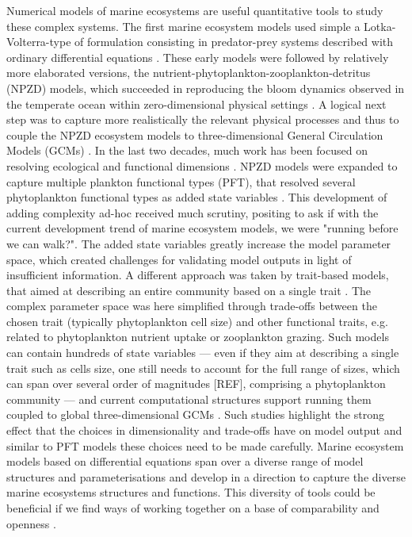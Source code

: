 \documentclass[journal abbreviation, manuscript]{copernicus}
\begin{document}
Numerical models of marine ecosystems are useful quantitative tools to study these complex systems. The first marine ecosystem models used simple a Lotka-Volterra-type of formulation consisting in predator-prey systems described with ordinary differential equations \citep{Fleming1939, Riley1946FactorsBank}. These early models were followed by relatively more elaborated versions, the nutrient-phytoplankton-zooplankton-detritus (NPZD) models, which succeeded in reproducing the bloom dynamics observed in the temperate ocean within zero-dimensional physical settings \citep{Evans1985ACycles, Fasham1990a}. A logical next step was to capture more realistically the relevant physical processes and thus to couple the NPZD ecosystem models to three-dimensional General Circulation Models (GCMs) \citep[e.g.][]{Sarmiento1993AZone}. In the last two decades, much work has been focused on resolving ecological and functional dimensions \citep{Follows2011ModelingMicrobes}. NPZD models were expanded to capture multiple plankton functional types (PFT), that resolved several phytoplankton functional types as added state variables \citep{LeQuere2005}. This development of adding complexity ad-hoc received much scrutiny, positing \citet{Anderson2005} to ask if with the current development trend of marine ecosystem models, we were "running before we can walk?". The added state variables greatly increase the model parameter space, which created challenges for validating model outputs in light of insufficient information. A different approach was taken by trait-based models, that aimed at describing an entire community based on a single trait \citep{Bruggeman2007a, Merico2009, Follows2007EmergentOcean}. The complex parameter space was here simplified through trade-offs between the chosen trait (typically phytoplankton cell size) and other functional traits, e.g. related to phytoplankton nutrient uptake or zooplankton grazing.
Such models can contain hundreds of state variables — even if they aim at describing a single trait such as cells size, one still needs to account for the full range of sizes, which can span over several order of magnitudes [REF], comprising a phytoplankton community — and current computational structures support running them coupled to global three-dimensional GCMs \citep{Dutkiewicz2020DimensionsDiversity}. Such studies highlight the strong effect that the choices in dimensionality and trade-offs have on model output and similar to PFT models these choices need to be made carefully.
Marine ecosystem models based on differential equations span over a diverse range of model structures and parameterisations and develop in a direction to capture the diverse marine ecosystems structures and functions. This diversity of tools could be beneficial if we find ways of working together on a base of comparability and openness \citep{Heymans2020TheChallenge}.
\end{document}
